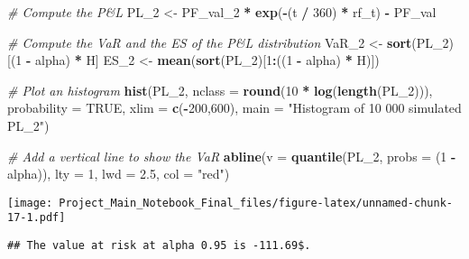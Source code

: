 \documentclass[]{article}
\newenvironment{Shaded}{\begin{snugshade}}{\end{snugshade}}
\newcommand{\CommentTok}[1]{\textcolor[rgb]{0.56,0.35,0.01}{\textit{#1}}}
\newcommand{\DataTypeTok}[1]{\textcolor[rgb]{0.13,0.29,0.53}{#1}}
\newcommand{\DecValTok}[1]{\textcolor[rgb]{0.00,0.00,0.81}{#1}}
\newcommand{\FloatTok}[1]{\textcolor[rgb]{0.00,0.00,0.81}{#1}}
\newcommand{\KeywordTok}[1]{\textcolor[rgb]{0.13,0.29,0.53}{\textbf{#1}}}
\newcommand{\NormalTok}[1]{#1}
\newcommand{\OperatorTok}[1]{\textcolor[rgb]{0.81,0.36,0.00}{\textbf{#1}}}
\newcommand{\OtherTok}[1]{\textcolor[rgb]{0.56,0.35,0.01}{#1}}
\newcommand{\StringTok}[1]{\textcolor[rgb]{0.31,0.60,0.02}{#1}}
\begin{document}
\begin{Shaded}
\begin{Highlighting}[]
\CommentTok{\# Compute the P\&L}
\NormalTok{PL\_}\DecValTok{2}\NormalTok{ <{-}}\StringTok{ }\NormalTok{PF\_val\_}\DecValTok{2} \OperatorTok{*}\StringTok{ }\KeywordTok{exp}\NormalTok{(}\OperatorTok{{-}}\NormalTok{(t }\OperatorTok{/}\StringTok{ }\DecValTok{360}\NormalTok{) }\OperatorTok{*}\StringTok{ }\NormalTok{rf\_t) }\OperatorTok{{-}}\StringTok{ }\NormalTok{PF\_val}

\CommentTok{\# Compute the VaR and the ES of the P\&L distribution}
\NormalTok{VaR\_}\DecValTok{2}\NormalTok{ <{-}}\StringTok{ }\KeywordTok{sort}\NormalTok{(PL\_}\DecValTok{2}\NormalTok{)[(}\DecValTok{1} \OperatorTok{{-}}\StringTok{ }\NormalTok{alpha) }\OperatorTok{*}\StringTok{ }\NormalTok{H]}
\NormalTok{ES\_}\DecValTok{2}\NormalTok{  <{-}}\StringTok{ }\KeywordTok{mean}\NormalTok{(}\KeywordTok{sort}\NormalTok{(PL\_}\DecValTok{2}\NormalTok{)[}\DecValTok{1}\OperatorTok{:}\NormalTok{((}\DecValTok{1} \OperatorTok{{-}}\StringTok{ }\NormalTok{alpha) }\OperatorTok{*}\StringTok{ }\NormalTok{H)])}

\CommentTok{\# Plot an histogram}
\KeywordTok{hist}\NormalTok{(PL\_}\DecValTok{2}\NormalTok{, }\DataTypeTok{nclass =} \KeywordTok{round}\NormalTok{(}\DecValTok{10} \OperatorTok{*}\StringTok{ }\KeywordTok{log}\NormalTok{(}\KeywordTok{length}\NormalTok{(PL\_}\DecValTok{2}\NormalTok{))), }
           \DataTypeTok{probability =} \OtherTok{TRUE}\NormalTok{, }\DataTypeTok{xlim =} \KeywordTok{c}\NormalTok{(}\OperatorTok{{-}}\DecValTok{200}\NormalTok{,}\DecValTok{600}\NormalTok{),}
           \DataTypeTok{main =} \StringTok{"Histogram of 10 000 simulated PL\_2"}\NormalTok{)}

\CommentTok{\# Add a vertical line to show the VaR}
\KeywordTok{abline}\NormalTok{(}\DataTypeTok{v   =} \KeywordTok{quantile}\NormalTok{(PL\_}\DecValTok{2}\NormalTok{, }\DataTypeTok{probs =}\NormalTok{ (}\DecValTok{1} \OperatorTok{{-}}\StringTok{ }\NormalTok{alpha)),}
       \DataTypeTok{lty =} \DecValTok{1}\NormalTok{,}
       \DataTypeTok{lwd =} \FloatTok{2.5}\NormalTok{,}
       \DataTypeTok{col =} \StringTok{"red"}\NormalTok{)}
\end{Highlighting}
\end{Shaded}

\texttt{[image: Project\_Main\_Notebook\_Final\_files/figure-latex/unnamed-chunk-17-1.pdf]}

\begin{verbatim}
## The value at risk at alpha 0.95 is -111.69$.
\end{verbatim}
\end{document}
